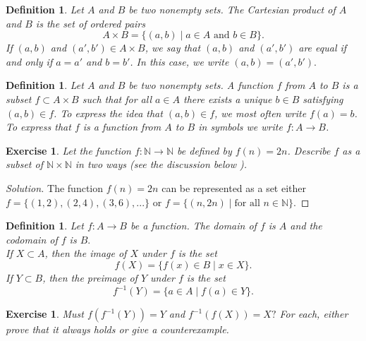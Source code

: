 \documentclass{amsart}
\newtheorem{definition}[theorem]{Definition}
\newtheorem{exercise}[theorem]{Exercise}
\newcommand{\N}{\mathbb N}
\newcommand{\1}{\mathds{1}}
\def \N {{\mathbb {N}}}
\numberwithin{equation}{section}
\numberwithin{theorem}{section}
\begin{document}
\begin{definition}  Let $A$ and $B$ be two nonempty sets. 
The \emph{Cartesian product} of $A$ and $B$ is the set of ordered pairs
\[
A \times B = \{ (a, b) \mid \text{$a \in A$ and $b \in B$} \}.
\]
If $(a, b)$ and $(a', b') \in A \times B$, we say that $(a, b)$ and $(a', b')$ are
\emph{equal} if and only if $a = a'$ and $b = b'$. In this case, we write $
(a, b) = (a', b').$


\end{definition}




\begin{definition} Let $A$ and $B$ be two nonempty sets.  
A \emph{function} $f$ from $A$ to $B$ is a subset $f \subset A \times B$ such that for all $a \in A$ there exists a unique $b \in B$ satisfying $(a, b) \in f$.  To express the idea that $(a, b) \in f$, we most
often write $f(a) = b$.  To express that $f$ is a function from $A$ to $B$ in symbols we write $f \colon A \rightarrow B$.  
\end{definition}


\begin{exercise}  
Let the function $f \colon \N \rightarrow \N$ be defined by
$f(n)=2n$.  Describe $f$ as a subset of $\N\times \N$ in two ways (see the discussion below ). 

\end{exercise}

\begin{proof}[Solution]
	The function $f(n)=2n$ can be represented as a set either $f = \{(1,2) ,(2,4), (3,6), ...\}\text{ or } f = \{(n,2n)\mid\text{for all } n\in \N\}$.
	
\end{proof}

\begin{definition}  Let $f \colon A \rightarrow B$ be a function.  The \emph{domain} of $f$ is $A$ and the \emph{codomain} of $f$ is $B.$\\
If $X \subset A$, then the \emph{image of $X$ under $f$} is the set
\[
f(X) = \{ f(x) \in B \mid  x \in X \}.
\]
If $Y \subset B$, then the \emph{preimage of $Y$ under $f$} is the set
\[
f^{-1}(Y) = \{ a \in A \mid f(a) \in Y \}.
\]
\end{definition}

\begin{exercise}
Must $f(f^{-1}(Y))=Y$ and $f^{-1}(f(X))=X?$ For each, either prove that it always holds or give a counterexample.

\end{exercise}
\end{document}
